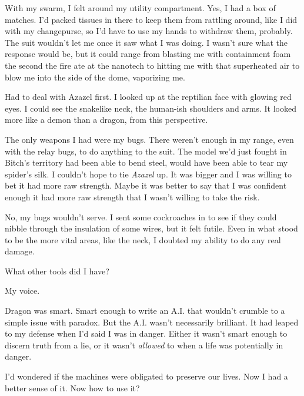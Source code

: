 With my swarm, I felt around my utility compartment.  Yes, I had a box of matches.  I'd packed tissues in there to keep them from rattling around, like I did with my changepurse, so I'd have to use my hands to withdraw them, probably.  The suit wouldn't let me once it saw what I was doing.  I wasn't sure what the response would be, but it could range from blasting me with containment foam the second the fire ate at the nanotech to hitting me with that superheated air to blow me into the side of the dome, vaporizing me.



Had to deal with Azazel first.  I looked up at the reptilian face with glowing red eyes.  I could see the snakelike neck, the human-ish shoulders and arms.  It looked more like a demon than a dragon, from this perspective.



The only weapons I had were my bugs.  There weren't enough in my range, even with the relay bugs, to do anything to the suit.  The model we'd just fought in Bitch's territory had been able to bend steel, would have been able to tear my spider's silk.  I couldn't hope to tie \emph{Azazel} up.  It was bigger and I was willing to bet it had more raw strength.  Maybe it was better to say that I was confident enough it had more raw strength that I wasn't willing to take the risk.



No, my bugs wouldn't serve.  I sent some cockroaches in to see if they could nibble through the insulation of some wires, but it felt futile.  Even in what stood to be the more vital areas, like the neck, I doubted my ability to do any real damage.



What other tools did I have?



My voice.



Dragon was smart.  Smart enough to write an A.I. that wouldn't crumble to a simple issue with paradox.  But the A.I. wasn't necessarily brilliant.  It had leaped to my defense when I'd said I was in danger.  Either it wasn't smart enough to discern truth from a lie, or it wasn't \emph{allowed} to when a life was potentially in danger.



I'd wondered if the machines were obligated to preserve our lives.  Now I had a better sense of it.  Now how to use it?



